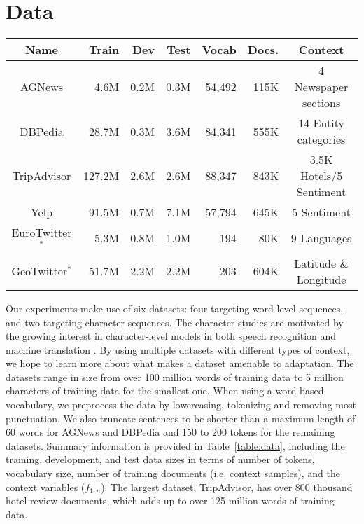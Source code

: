 \section{Data}
\label{sec:data}

\begin{table*}[h]
\centering
\begin{tabular}{crrrrrc}
\textbf{Name} & \textbf{Train} & \textbf{Dev} & \textbf{Test} & \textbf{Vocab} & \textbf{Docs.} & \textbf{Context} \\ \hline
AGNews & 4.6M & 0.2M & 0.3M & 54,492 & 115K & 4 Newspaper sections \\
DBPedia & 28.7M & 0.3M & 3.6M & 84,341 & 555K & 14 Entity categories \\
TripAdvisor & 127.2M & 2.6M & 2.6M & 88,347 & 843K & 3.5K Hotels/5 Sentiment \\
Yelp & 91.5M & 0.7M & 7.1M & 57,794 & 645K & 5 Sentiment \\
EuroTwitter$^*$ & 5.3M &  0.8M & 1.0M & 194 & 80K & 9 Languages \\
GeoTwitter$^*$ & 51.7M & 2.2M & 2.2M & 203 & 604K & Latitude \& Longitude
\end{tabular}
\caption{Dataset statistics: Dataset size in words (* or characters) of Train, Dev and Test sets, vocabulary size, number of training documents, and context variables.}
\label{table:data}
\end{table*}

Our experiments make use of six datasets: four targeting word-level sequences, and two targeting character sequences. The character studies are motivated by the growing interest in character-level models in both speech recognition and machine translation \cite{hannun2014deep,chung2016character}. By using multiple datasets with different types of context, we hope to learn more about what makes a dataset amenable to adaptation. The datasets range in size from over 100 million words of training data to 5 million characters of training data for the smallest one.
When using a word-based vocabulary, we preprocess the data by lowercasing, tokenizing and removing most punctuation. We also truncate sentences to be shorter than a maximum length of 60 words for AGNews and DBPedia and 150 to 200 tokens for the remaining datasets. 
Summary information is provided in Table~\ref{table:data}, including the training, development, and test data sizes in terms of number of tokens, vocabulary size, number of training documents (i.e. context samples), and the context variables ($f_{1:n}$). The largest dataset, TripAdvisor, has over 800 thousand hotel review documents, which adds up to over 125 million words of training data. 

